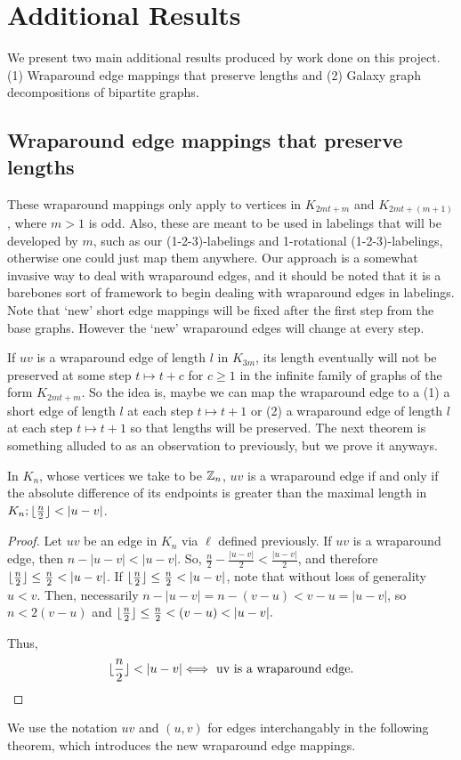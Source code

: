 \chapter{Additional Results} \label{chap:Additional Results}

We present two main additional results produced by work done on this project. (1) Wraparound edge mappings that preserve lengths and (2) Galaxy graph decompositions of bipartite graphs.

\section{Wraparound edge mappings that preserve lengths}

These wraparound mappings only apply to vertices in $K_{2mt+m}$ and $K_{2mt+(m+1)}$, where $m>1$ is odd. Also, these are meant to be used in labelings that will be developed by $m$, such as our (1-2-3)-labelings and 1-rotational (1-2-3)-labelings, otherwise one could just map them anywhere. Our approach is a somewhat invasive way to deal with wraparound edges, and it should be noted that it is a barebones sort of framework to begin dealing with wraparound edges in labelings. Note that `new' short edge mappings will be fixed after the first step from the base graphs. However the `new' wraparound edges will change at every step.

If $uv$ is a wraparound edge of length $l$ in $K_{3m}$, its length eventually will not be preserved at some step $t\mapsto t+c$ for $c\geq 1$ in the infinite family of graphs of the form $K_{2mt+m}$. So the idea is, maybe we can map the wraparound edge to a (1) a short edge of length $l$ at each step $t\mapsto t+1$ or (2) a wraparound edge of length $l$ at each step $t\mapsto t+1$ so that lengths will be preserved. The next theorem is something alluded to as an observation to previously, but we prove it anyways.\newpage
\begin{thm} \label{thm:wraplarger}
    In $K_{n}$, whose vertices we take to be $\mathbb{Z}_{n}$, $uv$ is a wraparound edge if and only if the absolute difference of its endpoints is greater than the maximal length in $K_{n};\floor{\frac{n}{2}}<|u-v|$. 
    \begin{proof}
        Let $uv$ be an edge in $K_{n}$ via $\ell$ defined previously. If $uv$ is a wraparound edge, then $n-|u-v|<|u-v|$. So, $\frac{n}{2}-\frac{|u-v|}{2}<\frac{|u-v|}{2}$, and therefore $\floor{\frac{n}{2}}\leq \frac{n}{2}<|u-v|$. If $\floor{\frac{n}{2}}\leq \frac{n}{2}<|u-v|$, note that without loss of generality $u<v$. Then, necessarily $n-|u-v|=n-(v-u)<v-u=|u-v|$, so $n<2(v-u)$ and $\floor{\frac{n}{2}}\leq\frac{n}{2}<(v-u)<|u-v|.$
    
        Thus,
        $$\floor{\frac{n}{2}}<|u-v|\Longleftrightarrow\text{ uv is a wraparound edge.}$$
    \end{proof}
    \end{thm}
We use the notation $uv$ and $(u,v)$ for edges interchangably in the following theorem, which introduces the new wraparound edge mappings.

